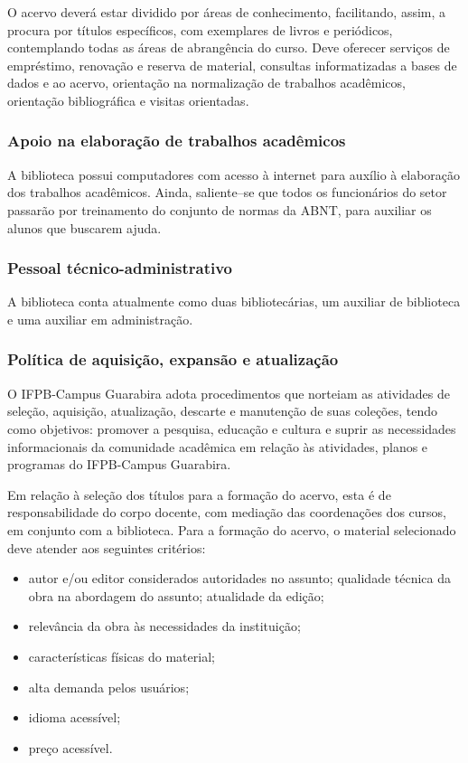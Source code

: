 O acervo deverá estar dividido por áreas de conhecimento, facilitando, assim, a procura por títulos específicos, com exemplares de livros e periódicos, contemplando todas as áreas de abrangência do curso. Deve oferecer serviços de empréstimo, renovação e reserva de material, consultas informatizadas a bases de dados e ao acervo, orientação na normalização de trabalhos acadêmicos, orientação bibliográfica e visitas orientadas.

\subsubsection{Apoio na elaboração de trabalhos acadêmicos}

A biblioteca possui computadores com acesso à internet para auxílio à elaboração dos trabalhos acadêmicos. Ainda, saliente–se que todos os funcionários do setor passarão por treinamento do conjunto de normas da ABNT, para auxiliar os alunos que buscarem ajuda.

\subsubsection{Pessoal técnico-administrativo}

A biblioteca conta atualmente como duas bibliotecárias, um auxiliar de biblioteca e uma auxiliar em administração.

\subsubsection{Política de aquisição, expansão e atualização}

O IFPB-Campus Guarabira adota procedimentos que norteiam as atividades de seleção, aquisição, atualização, descarte e manutenção de suas coleções, tendo como objetivos: promover a pesquisa, educação e cultura e suprir as necessidades informacionais da comunidade acadêmica em relação às atividades, planos e programas do IFPB-Campus Guarabira.
 
Em relação à seleção dos títulos para a formação do acervo, esta é de responsabilidade do corpo docente, com mediação das coordenações dos cursos, em conjunto com a biblioteca. Para a formação do acervo, o material selecionado deve atender aos seguintes critérios: 

\begin{itemize}
	\item autor e/ou editor considerados autoridades no assunto;  qualidade técnica da obra na abordagem do assunto; atualidade da edição; 
	\item relevância da obra às necessidades da instituição;
	\item características físicas do material; 
	\item alta demanda pelos usuários; 
	\item idioma acessível; 
	\item preço acessível. 
\end{itemize}

